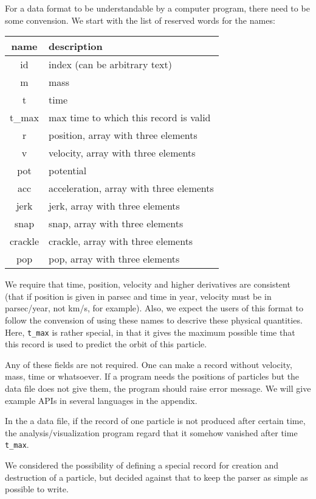\documentclass[12pt]{article}
\begin{document}
For a data format to be understandable by a computer program, there
need to be some convension. We start with the list of reserved words
for the names:

\begin{center}
\begin{tabular}{|c|l|}
\hline
name & description\\
\hline
id & index (can be arbitrary text)\\
m & mass\\
t & time\\
t\_max & max time to which this record is valid \\
r  & position, array with three elements\\
v  & velocity, array with three elements\\
pot  & potential\\
acc  & acceleration, array with three elements\\
jerk  & jerk, array with three elements\\
snap  & snap, array with three elements\\
crackle  & crackle, array with three elements\\
pop  & pop, array with three elements\\
\hline
\end{tabular}
\end{center}

We require that time, position, velocity and higher derivatives are
consistent (that if position is given in parsec and time in year,
velocity must be in parsec/year, not km/s, for example). Also, we
expect the users of this format to follow the convension of using
these names to descrive these physical quantities. Here, {\tt t\_max}
is rather special, in that it gives the maximum possible time that
this record is used to predict the orbit of this particle.

Any of these fields are not required. One can make a record without
velocity, mass, time or whatsoever. If a program needs the positions
of particles but the data file does not give them, the program should
raise error message. We will give example APIs in several languages in
the appendix.

In the a data file, if the record of one particle is not produced
after certain time, the analysis/visualization program regard that it
somehow vanished after time {\tt t\_max}.

We considered the possibility of defining a special record for
creation and destruction of a particle, but decided against that to
keep the parser as simple as possible to write.
\end{document}
